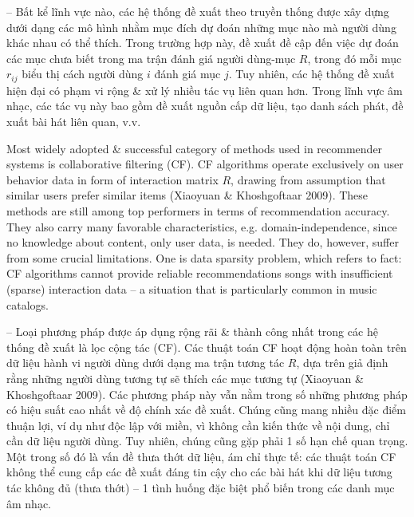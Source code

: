 \documentclass{article}
\begin{document}
\begin{itemize}
    -- Bất kể lĩnh vực nào, các hệ thống đề xuất theo truyền thống được xây dựng dưới dạng các mô hình nhằm mục đích dự đoán những mục nào mà người dùng khác nhau có thể thích. Trong trường hợp này, đề xuất đề cập đến việc dự đoán các mục chưa biết trong ma trận đánh giá người dùng-mục $R$, trong đó mỗi mục $r_{ij}$ biểu thị cách người dùng $i$ đánh giá mục $j$. Tuy nhiên, các hệ thống đề xuất hiện đại có phạm vi rộng \& xử lý nhiều tác vụ liên quan hơn. Trong lĩnh vực âm nhạc, các tác vụ này bao gồm đề xuất nguồn cấp dữ liệu, tạo danh sách phát, đề xuất bài hát liên quan, v.v.

    Most widely adopted \& successful category of methods used in recommender systems is collaborative filtering (CF). CF algorithms operate exclusively on user behavior data in form of interaction matrix $R$, drawing from assumption that similar users prefer similar items (Xiaoyuan \& Khoshgoftaar 2009). These methods are still among top performers in terms of recommendation accuracy. They also carry many favorable characteristics, e.g. domain-independence, since no knowledge about content, only user data, is needed. They do, however, suffer from some crucial limitations. One is data sparsity problem, which refers to fact: CF algorithms cannot provide reliable recommendations songs with insufficient (sparse) interaction data -- a situation that is particularly common in music catalogs.

    -- Loại phương pháp được áp dụng rộng rãi \& thành công nhất trong các hệ thống đề xuất là lọc cộng tác (CF). Các thuật toán CF hoạt động hoàn toàn trên dữ liệu hành vi người dùng dưới dạng ma trận tương tác $R$, dựa trên giả định rằng những người dùng tương tự sẽ thích các mục tương tự (Xiaoyuan \& Khoshgoftaar 2009). Các phương pháp này vẫn nằm trong số những phương pháp có hiệu suất cao nhất về độ chính xác đề xuất. Chúng cũng mang nhiều đặc điểm thuận lợi, ví dụ như độc lập với miền, vì không cần kiến thức về nội dung, chỉ cần dữ liệu người dùng. Tuy nhiên, chúng cũng gặp phải 1 số hạn chế quan trọng. Một trong số đó là vấn đề thưa thớt dữ liệu, ám chỉ thực tế: các thuật toán CF không thể cung cấp các đề xuất đáng tin cậy cho các bài hát khi dữ liệu tương tác không đủ (thưa thớt) -- 1 tình huống đặc biệt phổ biến trong các danh mục âm nhạc.


\end{itemize}
\end{document}
